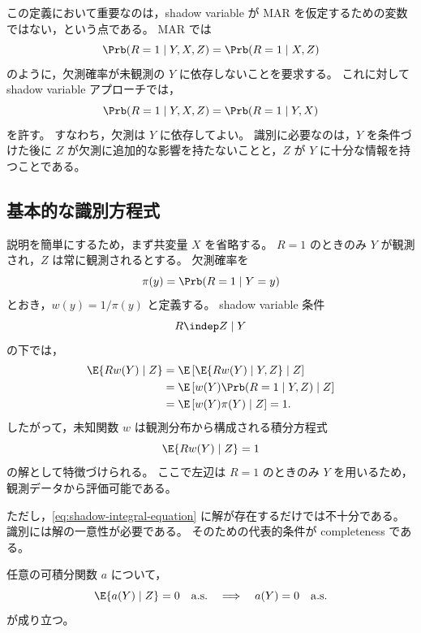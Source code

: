 この定義において重要なのは，shadow variable が MAR を仮定するための変数ではない，という点である。
MAR では
\begin{equation}
  \Prb(R=1\mid Y,X,Z)
  =
  \Prb(R=1\mid X,Z)
  \label{eq:mar-shadow-section}
\end{equation}
のように，欠測確率が未観測の $Y$ に依存しないことを要求する。
これに対して shadow variable アプローチでは，
\begin{equation}
  \Prb(R=1\mid Y,X,Z)
  =
  \Prb(R=1\mid Y,X)
  \label{eq:mnar-shadow-section}
\end{equation}
を許す。
すなわち，欠測は $Y$ に依存してよい。
識別に必要なのは，$Y$ を条件づけた後に $Z$ が欠測に追加的な影響を持たないことと，$Z$ が $Y$ に十分な情報を持つことである。

\subsection{基本的な識別方程式}

説明を簡単にするため，まず共変量 $X$ を省略する。
$R=1$ のときのみ $Y$ が観測され，$Z$ は常に観測されるとする。
欠測確率を
\begin{equation}
  \pi(y)=\Prb(R=1\mid Y=y)
  \label{eq:pi-shadow-section}
\end{equation}
とおき，$w(y)=1/\pi(y)$ と定義する。
shadow variable 条件
\begin{equation}
  R\indep Z\mid Y
  \label{eq:shadow-basic}
\end{equation}
の下では，
\begin{align}
  \E\{R w(Y)\mid Z\}
  &=
  \E\left[
    \E\{R w(Y)\mid Y,Z\}
    \mid Z
  \right] \notag \\
  &=
  \E\left[
    w(Y)\Prb(R=1\mid Y,Z)
    \mid Z
  \right] \notag \\
  &=
  \E\left[
    w(Y)\pi(Y)
    \mid Z
  \right]
  =
  1.
  \label{eq:shadow-moment-basic}
\end{align}
したがって，未知関数 $w$ は観測分布から構成される積分方程式
\begin{equation}
  \E\{R w(Y)\mid Z\}=1
  \label{eq:shadow-integral-equation}
\end{equation}
の解として特徴づけられる。
ここで左辺は $R=1$ のときのみ $Y$ を用いるため，観測データから評価可能である。

ただし，\eqref{eq:shadow-integral-equation} に解が存在するだけでは不十分である。
識別には解の一意性が必要である。
そのための代表的条件が completeness である。

\begin{assumption}
\label{ass:shadow-completeness-review}
任意の可積分関数 $a$ について，
\begin{equation}
  \E\{a(Y)\mid Z\}=0 \quad \mathrm{a.s.}
  \quad\Longrightarrow\quad
  a(Y)=0 \quad \mathrm{a.s.}
  \label{eq:shadow-completeness-review}
\end{equation}
が成り立つ。
\end{assumption}

